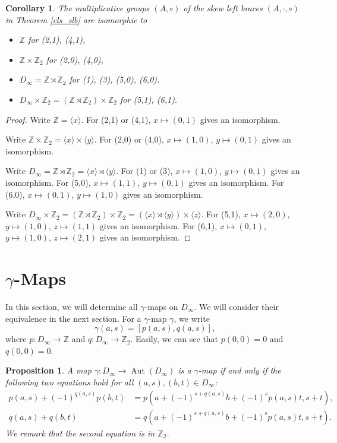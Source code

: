 \documentclass[12pt]{amsart}
\newtheorem{prop}[thm]{Proposition}
\newtheorem{coro}[thm]{Corollary}
\theoremstyle{definition}
\newcommand{\Z}{\mathbb{Z}}
\newcommand{\Aut}{\operatorname{Aut}}
\newcommand{\ci}{\circ}
\begin{document}
\begin{coro}
  The multiplicative groups $(A,\ci)$ of the skew left braces
  $(A,\cdot,\ci)$ in Theorem \ref{cls_slb} are isomorphic to 
  \begin{itemize}
    \item $\Z$ for (2,1), (4,1),
    \item $\Z\times \Z_2$ for (2,0), (4,0), 
    \item $D_\infty=\Z\rtimes \Z_2$ for (1), (3), (5,0), (6,0).
    \item $D_\infty\times \Z_2=(\Z\rtimes \Z_2)\times \Z_2$ for (5,1), (6,1).
  \end{itemize}
\end{coro}

\begin{proof}
  Write $\Z=\langle x\rangle$.
  For (2,1) or (4,1), $x\mapsto(0,1)$  gives an isomorphism.
  
  Write $\Z\times \Z_2=\langle x\rangle\times \langle y\rangle$.
  For (2,0) or (4,0), $x\mapsto(1,0)$, $y\mapsto(0,1)$
  gives an isomorphism.
  
  Write $D_\infty=\Z\rtimes \Z_2=\langle x\rangle\rtimes\langle y\rangle$.
  For (1) or (3), $x\mapsto(1,0)$, $y\mapsto(0,1)$ gives an isomorphism.
  For (5,0), $x\mapsto(1,1)$, $y\mapsto(0,1)$ gives an isomorphism.
  For (6,0), $x\mapsto(0,1)$, $y\mapsto(1,0)$ gives an isomorphism.

  Write $D_\infty\times \Z_2=(\Z\rtimes \Z_2)\times \Z_2
  =(\langle x\rangle\rtimes\langle y\rangle)\times\langle z\rangle$.
  For (5,1), $x\mapsto(2,0)$, $y\mapsto(1,0)$, $z\mapsto(1,1)$
  gives an isomorphism.
  For (6,1), $x\mapsto(0,1)$, $y\mapsto(1,0)$, $z\mapsto(2,1)$
  gives an isomorphism.
\end{proof}

\section{$\gamma$-Maps}
In this section, we will determine all $\gamma$-maps on $D_\infty$.
We will consider their equivalence in the next section.
For a $\gamma$-map $\gamma$, we write
$$\gamma(a,s)=[p(a,s),q(a,s)],$$
where $p:D_\infty\to \Z$ and $q:D_\infty\to \Z_2$.
Easily, we can see that $p(0,0)=0$ and $q(0,0)=0$.

\begin{prop}\label{prop_gamma}
  A map $\gamma:D_\infty\to \Aut(D_\infty)$ is a $\gamma$-map if and only if
  the following two equations hold for all $(a,s), (b,t)\in D_\infty$:
  \begin{align}
    p(a,s)+(-1)^{q(a,s)}p(b,t)
    &=p(a+(-1)^{s+q(a,s)}b+(-1)^sp(a,s)t,s+t),\tag{$\star$}\\
    q(a,s)+q(b,t)
    &=q(a+(-1)^{s+q(a,s)}b+(-1)^sp(a,s)t,s+t).\tag{$\star\star$}
  \end{align}
  We remark that the second equation is in $\Z_2$.
\end{prop}
\end{document}
